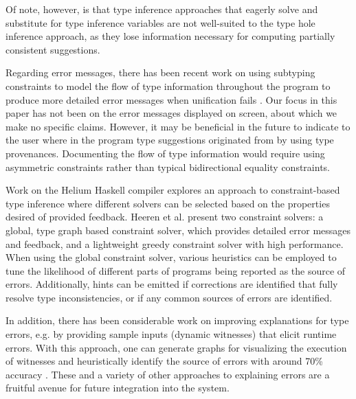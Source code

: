 Of note, however, is that type inference approaches that eagerly solve and substitute for type inference variables \cite{DBLP:journals/tapos/OderskySW99,DBLP:conf/icfp/Pottier14,mcadam1998unification} are not well-suited to the type hole inference approach, as they lose information necessary for computing partially consistent suggestions. 


Regarding error messages, there has been recent work on using subtyping constraints to model the flow of type information throughout the program to produce more detailed error messages when unification fails \cite{Bhanuka_Parreaux_Binder_Brachthäuser_2023}. Our focus in this paper has not been on the error messages displayed on screen, about which we make no specific claims. However, it may be beneficial in the future to indicate to the user where in the program type suggestions originated from by using type provenances. Documenting the flow of type information would require using asymmetric constraints rather than typical bidirectional equality constraints.

Work on the Helium Haskell compiler \cite{DBLP:conf/haskell/HeerenLI03} explores an approach to constraint-based type inference where different solvers can be selected based on the properties desired of provided feedback. Heeren et al. present two constraint solvers: a global, type graph based constraint solver, which provides detailed error messages and feedback, and a lightweight greedy constraint solver with high performance. When using the global constraint solver, various heuristics can be employed to tune the likelihood of different parts of programs being reported as the source of errors. Additionally, hints can be emitted if corrections are identified that fully resolve type inconsistencies, or if any common sources of errors are identified.

In addition, there has been considerable work on improving explanations for type errors, e.g. by providing sample inputs (dynamic witnesses) that elicit runtime errors. With this approach, one can generate graphs for visualizing the execution of witnesses and heuristically identify the source of errors with around 70\% accuracy \cite{Seidel2016}.
These and a variety of other approaches to explaining errors are a fruitful avenue for future integration into the system.



